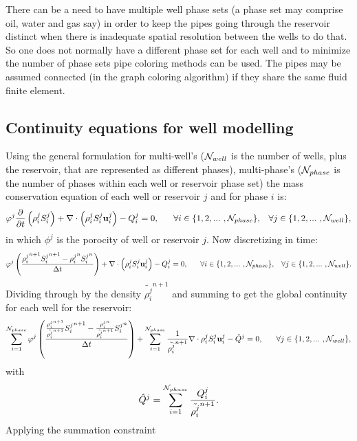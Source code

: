 There can be a need to have multiple well phase sets (a phase set may comprise oil, water and gas say) 
in order to keep the 
pipes going through the reservoir distinct when there is inadequate spatial resolution 
between the wells to do that. So one does not normally have a different phase set for each well and to minimize the 
number of phase sets pipe coloring methods can be used. The pipes may be assumed connected (in the graph coloring algorithm) if they share the same fluid finite element. 


\subsection{Continuity equations for well modelling} 
\label{Continuity equation for well modelling} 
Using the general formulation for multi-well's (${\cal N}_{well}$ is the number of wells, plus the reservoir, 
that are represented as different phases), multi-phase's (${\cal N}_{phase}$ is the number of phases within each well or reservoir phase set) the mass conservation equation of each well or reservoir $j$ and for phase $i$ is: 
\begin{equation} 
\phi^j \displaystyle\frac{\partial}{\partial t}\left( \rho_{i}^{j}S_i^{j}\right) + \nabla\cdot\left(\rho_{i}^{j}S_i^{j}\mathbf{u}_i^{j}\right) - Q_{i}^j = 0,
~~~~~ \forall i \in\{ 1,2,...~ , {\cal N}_{phase}\}, \;\;\; 
\forall j \in\{ 1,2,...~ , {\cal N}_{well} \}, 
\label{saturation_wells_1}
\end{equation}
in which $\phi^j$ is the porocity of well or reservoir $j$. 
Now discretizing in time: 
\begin{equation}
\phi^j \displaystyle \left( \frac{  
 {\rho_{i}^{j}}^{n+1} {S_i^{j}}^{n+1} - {\rho_{i}^{j}}^n {S_i^{j}}^n
}{\Delta t} \right) + \nabla\cdot\left(\rho_{i}^{j}S_i^{j}\mathbf{u}_i^{j}\right) - Q_{i}^j = 0, 
~~~~~ \forall i \in\{ 1,2,...~ , {\cal N}_{phase}\}, \;\;\; 
\forall j \in\{ 1,2,...~ , {\cal N}_{well} \}. 
\label{saturation_wells_2}
\end{equation}
Dividing through by the density  $\tilde{\rho_{i}^{j}}^{n+1}$ and summing to get the global continuity for each well 
for the reservoir: 
\begin{equation}
\sum\limits_{i=1}^{{\cal N}_{phase}} 
\phi^j 
\left(  \frac{  
 \frac{   {\rho_{i}^{j}}^{n+1} }
{  \tilde{\rho_{i}^{j}}^{n+1}  }
{S_i^{j}}^{n+1} 
-  
\frac{ {\rho_{i}^{j}}^{n} }
{  \tilde{\rho_{i}^{j}}^{n+1}  }
{S_i^{j}}^n
}
{\Delta t}
\right) 
+ 
\sum\limits_{i=1}^{{\cal N}_{phase}}
\frac{1}{  \tilde{\rho_{i}^{j}}^{n+1}   }
\nabla\cdot\rho_{i}^{j}S_i^{j}\mathbf{u}_i^{j} 
- \hat Q^j = 0, 
~~~~~ \forall j \in\{ 1,2,...~ , {\cal N}_{well}\}, 
\label{saturation_wells_3}
\end{equation}
with 
\begin{equation}
\hat Q^j= \sum\limits_{i=1}^{{\cal N}_{phase}} \frac{Q_i^j}{\tilde{\rho_{i}^{j}}^{n+1}}. 
\label{saturation_wells_3b}
\end{equation}
Applying the summation constraint 

